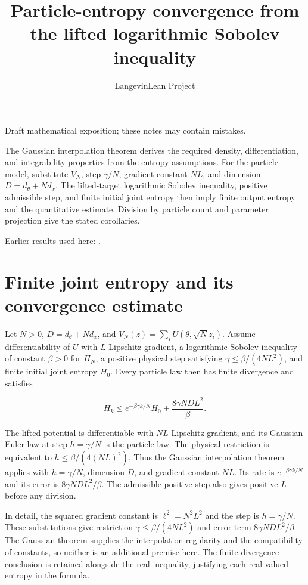 \documentclass[11pt,a4paper]{article}
\title{\texorpdfstring{Particle-entropy convergence from the lifted logarithmic Sobolev inequality}{Particle-entropy convergence from the lifted logarithmic Sobolev inequality}}
\author{LangevinLean Project}
\date{}
\begin{document}
\maketitle
Draft mathematical exposition; these notes may contain mistakes.


The Gaussian interpolation theorem derives the required density, differentiation, and integrability properties from the entropy assumptions. For the particle model, substitute \(V_N\), step \(\gamma/N\), gradient constant \(NL\), and dimension \(D=d_\theta+Nd_x\). The lifted-target logarithmic Sobolev inequality, positive admissible step, and finite initial joint entropy then imply finite output entropy and the quantitative estimate. Division by particle count and parameter projection give the stated corollaries.



Earlier results used here: \cite[Section~3.29]{LangevinLean2026ULALSI}.

\section{\texorpdfstring{Finite joint entropy and its convergence estimate}{Finite joint entropy and its convergence estimate}}


Let \(N>0\), \(D=d_\theta+Nd_x\), and \(V_N(z)=\sum_iU(\theta,\sqrt N z_i)\). Assume differentiability of \(U\) with \(L\)-Lipschitz gradient, a logarithmic Sobolev inequality of constant \(\beta>0\) for \(\Pi_N\), a positive physical step satisfying \(\gamma\le\beta/(4NL^2)\), and finite initial joint entropy \(H_0\). Every particle law then has finite divergence and satisfies

\[H_k\le e^{-\beta\gamma k/N}H_0+\frac{8\gamma ND L^2}{\beta}.\]

The lifted potential is differentiable with \(NL\)-Lipschitz gradient, and its Gaussian Euler law at step \(h=\gamma/N\) is the particle law. The physical restriction is equivalent to \(h\le\beta/(4(NL)^2)\). Thus the Gaussian interpolation theorem applies with \(h=\gamma/N\), dimension \(D\), and gradient constant \(NL\). Its rate is \(e^{-\beta\gamma k/N}\) and its error is \(8\gamma ND L^2/\beta\). The admissible positive step also gives positive \(L\) before any division.



In detail, the squared gradient constant is \(\ell^2=N^2L^2\) and the step is \(h=\gamma/N\). These substitutions give restriction \(\gamma\le\beta/(4NL^2)\) and error term \(8\gamma NDL^2/\beta\). The Gaussian theorem supplies the interpolation regularity and the compatibility of constants, so neither is an additional premise here. The finite-divergence conclusion is retained alongside the real inequality, justifying each real-valued entropy in the formula.
\end{document}
